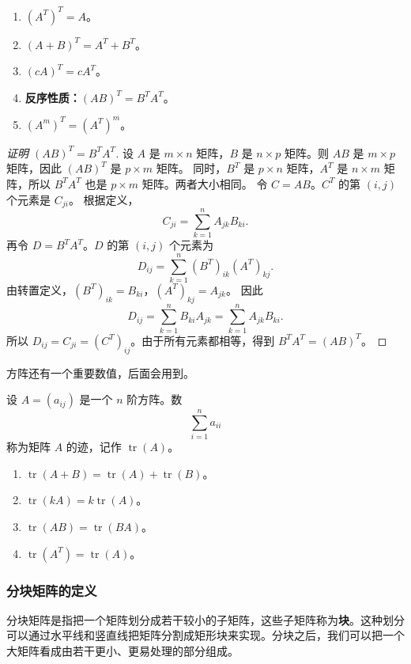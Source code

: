 \begin{property}[转置的性质]
\begin{enumerate}
    \item $(A^T)^T=A$。
    \item $(A+B)^T=A^T+B^T$。
    \item $(cA)^T=cA^T$。
    \item \textbf{反序性质：}$(AB)^T=B^TA^T$。
    \item $(A^m)^T=(A^T)^m$。
\end{enumerate}
\end{property}
\begin{proof}[证明 $(AB)^T=B^TA^T$]
设 $A$ 是 $m\times n$ 矩阵，$B$ 是 $n\times p$ 矩阵。则 $AB$ 是 $m\times p$ 矩阵，因此 $(AB)^T$ 是 $p\times m$ 矩阵。
同时，$B^T$ 是 $p\times n$ 矩阵，$A^T$ 是 $n\times m$ 矩阵，所以 $B^TA^T$ 也是 $p\times m$ 矩阵。两者大小相同。
令 $C=AB$。$C^T$ 的第 $(i,j)$ 个元素是 $C_{ji}$。
根据定义，
\[
C_{ji}=\sum_{k=1}^{n}A_{jk}B_{ki}.
\]
再令 $D=B^TA^T$。$D$ 的第 $(i,j)$ 个元素为
\[ D_{ij}=\sum_{k=1}^{n}(B^T)_{ik}(A^T)_{kj}. \]
由转置定义，$(B^T)_{ik}=B_{ki}$，$(A^T)_{kj}=A_{jk}$。
因此
\[
D_{ij}=\sum_{k=1}^{n}B_{ki}A_{jk}=\sum_{k=1}^{n}A_{jk}B_{ki}.
\]
所以 $D_{ij}=C_{ji}=(C^T)_{ij}$。由于所有元素都相等，得到 $B^TA^T=(AB)^T$。
\end{proof}

方阵还有一个重要数值，后面会用到。

\begin{definition}[矩阵的迹]
设 $A=(a_{ij})$ 是一个 $n$ 阶方阵。数
\[
\sum_{i=1}^{n}a_{ii}
\]
称为矩阵 $A$ 的迹，记作 $\operatorname{tr}(A)$。
\end{definition}

\begin{property}
\begin{enumerate}
    \item $\operatorname{tr}(A+B)=\operatorname{tr}(A)+\operatorname{tr}(B)$。
    \item $\operatorname{tr}(kA)=k\operatorname{tr}(A)$。
    \item $\operatorname{tr}(AB)=\operatorname{tr}(BA)$。
    \item $\operatorname{tr}(A^T)=\operatorname{tr}(A)$。
\end{enumerate}
\end{property}

\subsubsection*{分块矩阵的定义}
分块矩阵是指把一个矩阵划分成若干较小的子矩阵，这些子矩阵称为\textbf{块}。这种划分可以通过水平线和竖直线把矩阵分割成矩形块来实现。分块之后，我们可以把一个大矩阵看成由若干更小、更易处理的部分组成。

